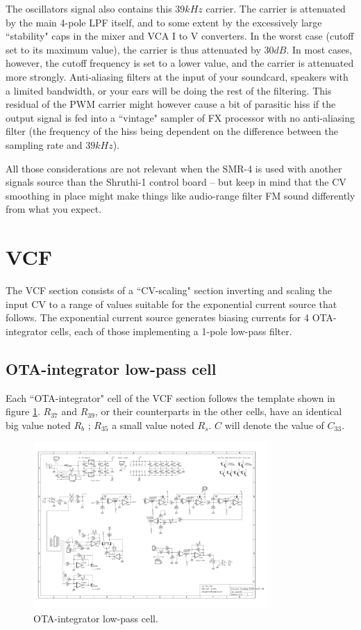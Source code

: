 \documentclass[a4paper,11pt]{article}
\begin{document}
The oscillators signal also contains this $39kHz$ carrier. The carrier is attenuated by the main 4-pole LPF itself, and to some extent by the excessively large ``stability" caps in the mixer and VCA I to V converters. In the worst case (cutoff set to its maximum value), the carrier is thus attenuated by $30dB$. In most cases, however, the cutoff frequency is set to a lower value, and the carrier is attenuated more strongly. Anti-aliasing filters at the input of your soundcard, speakers with a limited bandwidth, or your ears will be doing the rest of the filtering. This residual of the PWM carrier might however cause a bit of parasitic hiss if the output signal is fed into a ``vintage" sampler of FX processor with no anti-aliasing filter (the frequency of the hiss being dependent on the difference between the sampling rate and $39kHz$).

All those considerations are not relevant when the SMR-4 is used with another signals source than the Shruthi-1 control board -- but keep in mind that the CV smoothing in place might make things like audio-range filter FM sound differently from what you expect.

\section{VCF}
\label{sec:vcf}

The VCF section consists of a ``CV-scaling" section inverting and scaling the input CV to a range of values suitable for the exponential current source that follows. The exponential current source generates biasing currents for 4 OTA-integrator cells, each of those implementing a 1-pole low-pass filter.

\subsection{OTA-integrator low-pass cell}
\label{sec:otac}

Each ``OTA-integrator" cell of the VCF section follows the template shown in figure \ref{fig:otac}. $R_{37}$ and $R_{39}$, or their counterparts in the other cells, have an identical big value noted $R_b$ ; $R_{35}$ a small value noted $R_s$. $C$ will denote the value of $C_{33}$.

\begin{figure}
\centering
\includegraphics[width=0.8\textwidth]{smr4mkII_otac_cell.pdf}
\caption{OTA-integrator low-pass cell.}
\label{fig:otac}
\end{figure}
\end{document}
